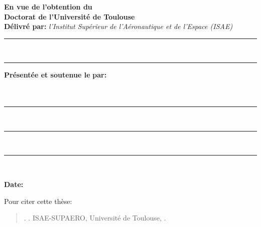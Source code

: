 


\pagestyle{empty}

\vspace*{1cm}

{
    \begin{center}

        {\bfseries En vue de l'obtention du} \\[0.5cm]
        {\Large \bfseries Doctorat de l'Université de Toulouse} \\[0.5cm]
        {\bfseries Délivré par:} {\it l'Institut Supérieur de l'Aéronautique et de l'Espace (ISAE)}\\[1.5cm]
        \rule{\textwidth}{2.5pt}\\[-2ex]
        \rule{\textwidth}{1.2pt}
        {\bfseries {} Présentée et soutenue le} \textit{\theSoutenance} {\bfseries {} par:}\\[0.2cm]
        {\Large\textbf{\theAuteur}} \\[0.2cm]
        \vspace{-5pt}
        ~{\color{black}\rule{1.2\RuleWidth}{0.8pt}}\\[0.2cm]
        \vspace{3pt}
        {\Large\bfseries \theTitre}
        \rule{\textwidth}{1.2pt}\\[-1.6ex]
        \rule{\textwidth}{2.5pt}\\[0.5cm]

    \end{center}

    {\bfseries Date:}\\[0.2cm]
    \phantom{\bfseries Date: } \theSoutenance%
}


    \vfill

    Pour citer cette thèse:
    \begin{quote}
        \theAuteur.
        \theTitre.
        ISAE-SUPAERO, Université de Toulouse, \theSoutenance.
    \end{quote}

